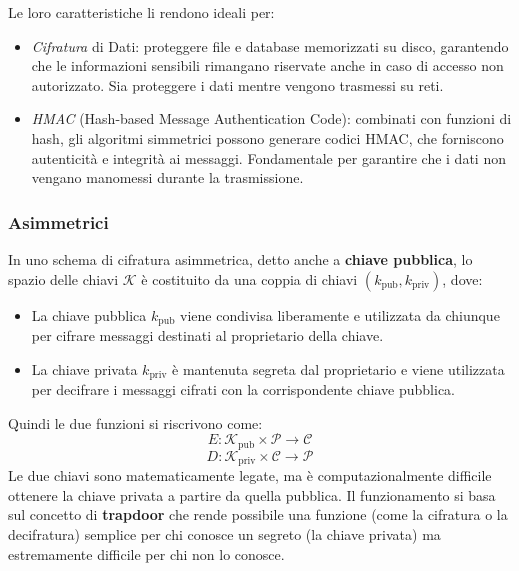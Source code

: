 \noindent
Le loro caratteristiche li rendono ideali per:

\begin{itemize}
    \item \textit{Cifratura} di Dati: proteggere file e database memorizzati
    su disco, garantendo che le informazioni sensibili rimangano riservate anche
    in caso di accesso non autorizzato. Sia proteggere i dati mentre vengono trasmessi su reti.
    \item \textit{HMAC} (Hash-based Message Authentication Code): combinati
    con funzioni di hash, gli algoritmi simmetrici possono generare codici HMAC,
    che forniscono autenticità e integrità ai messaggi. Fondamentale per
    garantire che i dati non vengano manomessi durante la trasmissione.
\end{itemize}




\subsubsection*{Asimmetrici}

In uno schema di cifratura asimmetrica, detto anche a \textbf{chiave pubblica}, lo spazio delle chiavi \(\mathcal{K}\) è costituito da una coppia di chiavi \((k_{\text{pub}}, k_{\text{priv}})\), dove:

\begin{itemize}
    \item La chiave pubblica \(k_{\text{pub}}\) viene condivisa liberamente e utilizzata da chiunque per cifrare
    messaggi destinati al proprietario della chiave.
    \item La chiave privata \(k_{\text{priv}}\) è mantenuta segreta dal
    proprietario e viene utilizzata per decifrare i messaggi cifrati con la
    corrispondente chiave pubblica.
\end{itemize}

\noindent
Quindi le due funzioni si riscrivono come:
\begin{equation}
    E: \mathcal{K}_{\text{pub}} \times \mathcal{P} \to \mathcal{C}
\end{equation}
\begin{equation}
    D: \mathcal{K}_{\text{priv}} \times \mathcal{C} \to \mathcal{P}
\end{equation}
\noindent
Le due chiavi sono matematicamente legate, ma è computazionalmente difficile \\ ottenere la chiave privata a partire da quella pubblica. Il funzionamento 
si basa sul concetto di \textbf{trapdoor} che rende possibile una funzione (come la cifratura o la decifratura) semplice per chi conosce un segreto (la chiave privata) ma estremamente difficile per chi non lo conosce.
\\

